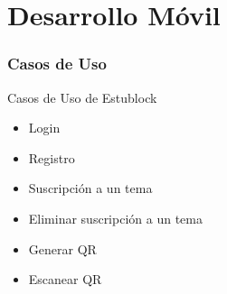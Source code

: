 \documentclass[usenames,dvipsnames]{beamer}
\begin{document}
\begin{frame}
\begin{columns}
\begin{column}{0.4\textwidth}
  \end{column}
  \end{columns}
\end{frame}


\section{Desarrollo Móvil}
\begin{frame} 
\frametitle{Casos de Uso} 
  \begin{block}{Casos de Uso de Estublock}
     \begin{itemize}
      \item Login
      \item Registro
      \item Suscripción a un tema
      \item Eliminar suscripción a un tema
      \item Generar QR
      \item Escanear QR
    \end{itemize}
  \end{block}
\end{frame} 
\end{document}
